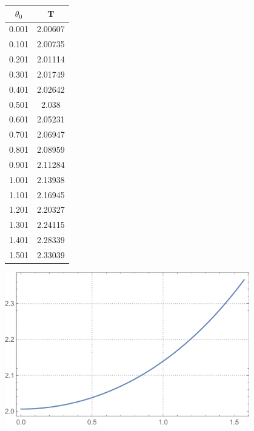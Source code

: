 \documentclass[reqno, a4paper]{amsart}
\begin{document}
		\vspace{5mm}
		\begin{minipage}{\textwidth}
			\begin{minipage}[b]{0.25\textwidth}
				\centering
				\begin{tabular}{|c|c|}
					\hline
					$\theta_{0}$ & T \\ 
					\hline
					0.001& 2.00607\\0.101& 2.00735\\0.201& 2.01114\\0.301& 2.01749\\0.401& 2.02642\\0.501& 2.038\\0.601& 2.05231\\0.701& 2.06947\\0.801& 2.08959\\0.901& 2.11284\\
					1.001& 2.13938\\1.101& 2.16945\\1.201& 2.20327\\1.301& 2.24115\\1.401& 2.28339\\1.501& 2.33039\\
					\hline
				\end{tabular}
			\end{minipage}
			\begin{minipage}[b]{0.79\textwidth}
				\centering
				\includegraphics[width=0.8\textwidth]{Elipticky integral, Perioda}
			\end{minipage}
			\hfill
		\end{minipage}
\end{document}
